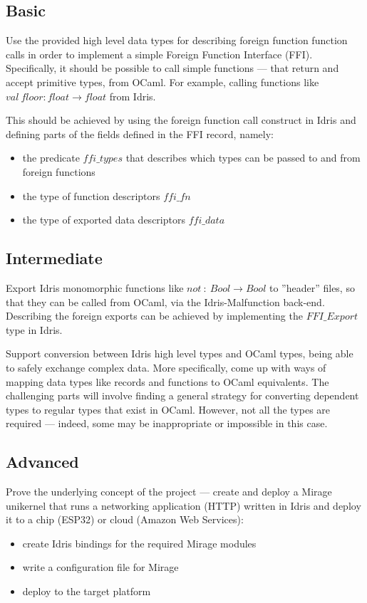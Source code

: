 \documentclass[a4paper]{report}
\begin{document}
\subsection{Basic}
Use the provided high level data types for describing foreign function
function calls in order to implement a simple Foreign Function Interface (FFI).
Specifically, it should be possible to call simple
functions --- that return
and accept primitive types, from OCaml.
For example, calling functions like
$val \ floor : float \rightarrow float$ from Idris.

This should be achieved by using the foreign function call construct in Idris
and defining parts of the fields defined in the FFI record, namely:
\begin{itemize}
	\item the predicate $ffi\_types$ that describes which types can be
	      passed to and from foreign functions
	\item the type of function descriptors $ffi\_fn$
	\item the type of exported data descriptors $ffi\_data$
\end{itemize}

\subsection{Intermediate}
Export Idris monomorphic functions like
$not \ : \ Bool \rightarrow Bool$ to ''header'' files, so that they can be
called from OCaml, via the Idris-Malfunction back-end.
Describing the foreign exports can be achieved by implementing the
$FFI\_Export$ type in Idris.

Support conversion between Idris high level types and OCaml types,
being able to safely exchange complex data.
More specifically, come up with ways of mapping data types like records and
functions to OCaml equivalents.
The challenging parts will involve finding a general strategy for converting
dependent types to regular types that exist in OCaml. However, not all the types are required --- indeed, some may be inappropriate or impossible in this
case.

\subsection{Advanced}
Prove the underlying concept of the project --- create and deploy a Mirage
unikernel that runs a networking application (HTTP) written in Idris and
deploy it to a chip (ESP32) or cloud (Amazon Web Services):
\begin{itemize}
	\item create Idris bindings for the required Mirage modules
	\item write a configuration file for Mirage
	\item deploy to the target platform
\end{itemize}
\end{document}

